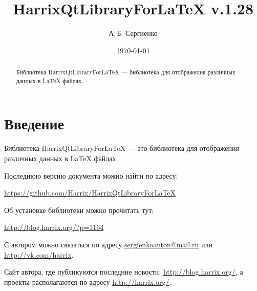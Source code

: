 \documentclass[a4paper,12pt]{article}
\title{HarrixQtLibraryForLaTeX v.1.28}
\author{А.\,Б. Сергиенко}
\date{\today}
\begin{document}


\maketitle

\begin{abstract}
Библиотека HarrixQtLibraryForLaTeX --- библиотека для отображения различных данных в LaTeX файлах.
\end{abstract}

\tableofcontents

\newpage

\section{Введение}

Библиотека HarrixQtLibraryForLaTeX --- это библиотека для отображения различных данных в LaTeX файлах.

Последнюю версию документа можно найти по адресу:

\href{https://github.com/Harrix/HarrixQtLibraryForLaTeX}{https://github.com/Harrix/HarrixQtLibraryForLaTeX}

Об установке библиотеки можно прочитать тут:

\href{http://blog.harrix.org/?p=1164}{http://blog.harrix.org/?p=1164}

С автором можно связаться по адресу \href{mailto:sergienkoanton@mail.ru}{sergienkoanton@mail.ru} или  \href{http://vk.com/harrix}{http://vk.com/harrix}.

Сайт автора, где публикуются последние новости: \href{http://blog.harrix.org/}{http://blog.harrix.org/}, а проекты располагаются по адресу \href{http://harrix.org/}{http://harrix.org/}.

\newpage
\end{document}
